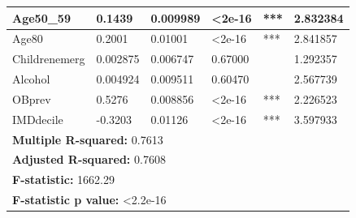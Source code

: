 \begin{table}[]
\begin{tabular}{|llllll|}
\multicolumn{1}{|l|}{Age50\_59}         & \multicolumn{1}{l|}{0.1439}               & \multicolumn{1}{l|}{0.009989}                    & \multicolumn{1}{l|}{\textless 2e-16}  & \multicolumn{1}{l|}{***}                   & 2.832384     \\ \hline
\multicolumn{1}{|l|}{Age80}             & \multicolumn{1}{l|}{0.2001}               & \multicolumn{1}{l|}{0.01001}                    & \multicolumn{1}{l|}{\textless 2e-16}  & \multicolumn{1}{l|}{***}                   & 2.841857     \\ \hline
\multicolumn{1}{|l|}{Childrenemerg}     & \multicolumn{1}{l|}{0.002875}             & \multicolumn{1}{l|}{0.006747}                    & \multicolumn{1}{l|}{0.67000}          & \multicolumn{1}{l|}{}                      & 1.292357     \\ \hline
\multicolumn{1}{|l|}{Alcohol}           & \multicolumn{1}{l|}{0.004924}             & \multicolumn{1}{l|}{0.009511}                    & \multicolumn{1}{l|}{0.60470}          & \multicolumn{1}{l|}{}                      & 2.567739     \\ \hline
\multicolumn{1}{|l|}{OBprev}            & \multicolumn{1}{l|}{0.5276}               & \multicolumn{1}{l|}{0.008856}                    & \multicolumn{1}{l|}{\textless 2e-16}  & \multicolumn{1}{l|}{***}                   & 2.226523     \\ \hline
\multicolumn{1}{|l|}{IMDdecile}         & \multicolumn{1}{l|}{-0.3203}              & \multicolumn{1}{l|}{0.01126}                    & \multicolumn{1}{l|}{\textless 2e-16}  & \multicolumn{1}{l|}{***}                   & 3.597933     \\ \hline \hline
\multicolumn{6}{|l|}{\textbf{Multiple R-squared:} 0.7613}                                                                                                                                        \\ \hline
\multicolumn{6}{|l|}{\textbf{Adjusted R-squared:} 0.7608}                                                                                                                                        \\ \hline
\multicolumn{6}{|l|}{\textbf{F-statistic:} 1662.29}                                                                                                                                              \\ \hline
\multicolumn{6}{|l|}{\textbf{F-statistic p value:} \textless 2.2e-16}                                                                                                                            \\ \hline

\end{tabular}
\end{table}
